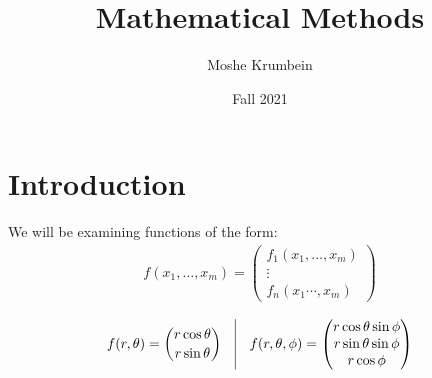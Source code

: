 \documentclass[00_complete]{subfiles}
\title{Mathematical Methods}
\author{Moshe Krumbein}
\date{Fall 2021}
\begin{document}

\section{Introduction}
We will be examining functions of the form:
\begin{gather*}
    f(x_1,\dots,x_m)=\begin{pmatrix}
        f_1(x_1,\dots,x_m) \\ \vdots \\
        f_n(x_1\cdots,x_m)
    \end{pmatrix}
\end{gather*}
\begin{example}
    \begin{gather*}
        f(r,\theta)=\binom{r\cos \theta}{r \sin \theta}
        \quad \vline \quad
        f(r, \theta, \phi)=\begin{pmatrix}
            r \cos \theta \sin \phi \\
            r \sin \theta \sin \phi \\
            r \cos \phi
        \end{pmatrix}
    \end{gather*}
\end{example}
\end{document}
